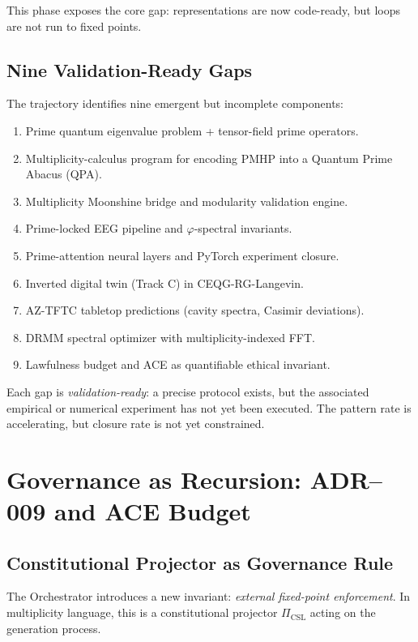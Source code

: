 \documentclass[11pt]{article}
\begin{document}
This phase exposes the core gap: representations are now code-ready, but loops are not run to fixed points.

\subsection{Nine Validation-Ready Gaps}

The trajectory identifies nine emergent but incomplete components:

\begin{enumerate}[leftmargin=*]
  \item Prime quantum eigenvalue problem + tensor-field prime operators.
  \item Multiplicity-calculus program for encoding PMHP into a Quantum Prime Abacus (QPA).
  \item Multiplicity Moonshine bridge and modularity validation engine.
  \item Prime-locked EEG pipeline and \(\varphi\)-spectral invariants.
  \item Prime-attention neural layers and PyTorch experiment closure.
  \item Inverted digital twin (Track C) in CEQG-RG-Langevin.
  \item AZ-TFTC tabletop predictions (cavity spectra, Casimir deviations).
  \item DRMM spectral optimizer with multiplicity-indexed FFT.
  \item Lawfulness budget and ACE as quantifiable ethical invariant.
\end{enumerate}

Each gap is \emph{validation-ready}: a precise protocol exists, but the associated empirical or numerical experiment has not yet been executed. The pattern rate is accelerating, but closure rate is not yet constrained.

\newpage

\section{Governance as Recursion: ADR--009 and ACE Budget}

\subsection{Constitutional Projector as Governance Rule}

The Orchestrator introduces a new invariant: \emph{external fixed-point enforcement}. In multiplicity language, this is a constitutional projector \(\Pi_{\mathrm{CSL}}\) acting on the generation process.
\end{document}

